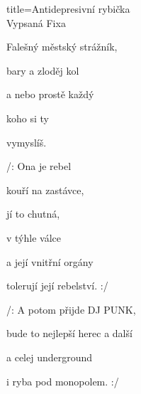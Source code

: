 \begin{song}{title=\centering Antidepresivní rybička \\\normalsize Vypsaná Fixa   \vspace*{-0.3cm}}
{\begin{minipage}[t]{0.48\textwidth}
  Falešný městský strážník,

  bary a zloděj kol 
  
  a nebo prostě každý 

  koho si ty 

  vymyslíš.


\sloka
 /:  Ona je rebel 
  
  kouří na zastávce,

  jí to chutná, 

  v týhle válce 

  a její vnitřní orgány

  tolerují její rebelství. :/

\sloka 
  /: A potom přijde DJ PUNK,

  bude to nejlepší herec a další 

  a celej underground 

  i ryba pod monopolem. :/



\end{minipage}
}
\setcounter{Slokočet}{0}
\end{song}

